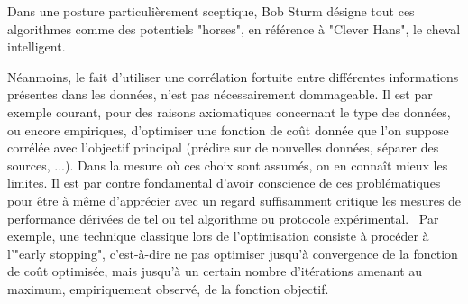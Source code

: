 Dans une posture particulièrement sceptique, Bob Sturm désigne tout ces algorithmes comme des potentiels "horses", en référence à "Clever Hans", le cheval intelligent.

Néanmoins, le fait d'utiliser une corrélation fortuite entre différentes informations présentes dans les données, n'est pas nécessairement dommageable. Il est par exemple courant, pour des raisons axiomatiques concernant le type des données, ou encore empiriques, d'optimiser une fonction de coût donnée que l'on suppose corrélée avec l'objectif principal (prédire sur de nouvelles données, séparer des sources, ...). Dans la mesure où ces choix sont assumés, on en connaît mieux les limites. Il est par contre fondamental d'avoir conscience de ces problématiques pour être à même d'apprécier avec un regard suffisamment critique les mesures de performance dérivées de tel ou tel algorithme ou protocole expérimental.~\cite{lagrangehal-01635373} Par exemple, une technique classique lors de l'optimisation consiste à procéder à l'"early stopping", c'est-à-dire ne pas optimiser jusqu'à convergence de la fonction de coût optimisée, mais jusqu'à un certain nombre d'itérations amenant au maximum, empiriquement observé, de la fonction objectif. %

